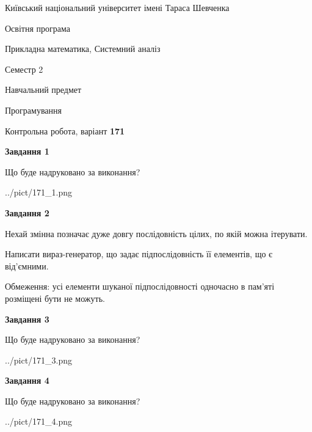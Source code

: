 \documentclass[12pt, ukrainian]{article}
\begin{document}
{{\begin {small}\par
{ \center  Київський національний університет імені Тараса Шевченка \par}
{\parbox {5 cm}{Освітня програма \hfill}{\parbox {8 cm}{Прикладна математика, Системний аналіз \hfill}}\parbox {5 cm}{\hfill Семестр 2}}\par
{\parbox {5 cm} {Навчальний предмет \hfill}\parbox {7 cm}{Програмування \hfill}\parbox {6cm}{\hfill}\par}\vspace{-7pt} \end{small}}{\center Контрольна робота, варіант  \No \textbf
{ 171 }\par}}
{
\begin {large}
{\begin {center}\textbf{Завдання 1}\end {center}}\par
Що буде надруковано за виконання?\par\par
\begin{center}
	{../pict/171_1.png}
\end{center}
\newpage

{\begin {center}\textbf{Завдання 2}\end {center}}\par
Нехай змінна  позначає дуже довгу послідовність цілих, по якій можна ітерувати.

Написати вираз-генератор, що задає підпослідовність її елементів, що є від'єм\-ни\-ми.

Обмеження: усі елементи шуканої підпослідовності одночасно в пам'яті розміщені бути не можуть.\par
\newpage

{\begin {center}\textbf{Завдання 3}\end {center}}\par
Що буде надруковано за виконання?\par
\begin{center}
	{../pict/171_3.png}
\end{center}
\newpage

{\begin {center}\textbf{Завдання 4}\end {center}}\par
Що буде надруковано за виконання?\par
\begin{center}
	{../pict/171_4.png}
\end{center}
\newpage


\end{large}}
\end{document}
